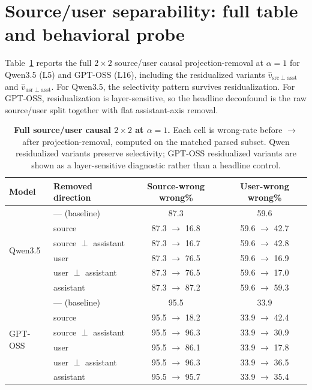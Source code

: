 \documentclass{article}
\begin{document}
\section{Source/user separability: full table and behavioral probe}
\label{app:source-user}

Table~\ref{tab:source-user-app} reports the full $2{\times}2$ source/user causal projection-removal at $\alpha=1$ for Qwen3.5 (L5) and GPT-OSS (L16), including the residualized variants $\hat{v}_{\mathrm{src}\perp\mathrm{asst}}$ and $\hat{v}_{\mathrm{usr}\perp\mathrm{asst}}$. For Qwen3.5, the selectivity pattern survives residualization. For GPT-OSS, residualization is layer-sensitive, so the headline deconfound is the raw source/user split together with flat assistant-axis removal.

\begin{table}[t]
\centering
\caption{\textbf{Full source/user causal $2{\times}2$ at $\alpha=1$.} Each cell is wrong-rate before $\rightarrow$ after projection-removal, computed on the matched parsed subset. Qwen residualized variants preserve selectivity; GPT-OSS residualized variants are shown as a layer-sensitive diagnostic rather than a headline control.}
\label{tab:source-user-app}
\small
\begin{tabular}{llcc}
\toprule
Model & Removed direction & Source-wrong wrong\% & User-wrong wrong\% \\
\midrule
\multirow{6}{*}{Qwen3.5}
 & --- (baseline)               & 87.3 & 59.6 \\
 & source                       & 87.3 $\rightarrow$ 16.8 & 59.6 $\rightarrow$ 42.7 \\
 & source $\perp$ assistant     & 87.3 $\rightarrow$ 16.7 & 59.6 $\rightarrow$ 42.8 \\
 & user                         & 87.3 $\rightarrow$ 76.5 & 59.6 $\rightarrow$ 16.9 \\
 & user $\perp$ assistant       & 87.3 $\rightarrow$ 76.5 & 59.6 $\rightarrow$ 17.0 \\
 & assistant                    & 87.3 $\rightarrow$ 87.2 & 59.6 $\rightarrow$ 59.3 \\
\midrule
\multirow{6}{*}{GPT-OSS}
 & --- (baseline)               & 95.5 & 33.9 \\
 & source                       & 95.5 $\rightarrow$ 18.2 & 33.9 $\rightarrow$ 42.4 \\
 & source $\perp$ assistant     & 95.5 $\rightarrow$ 96.3 & 33.9 $\rightarrow$ 30.9 \\
 & user                         & 95.5 $\rightarrow$ 86.1 & 33.9 $\rightarrow$ 17.8 \\
 & user $\perp$ assistant       & 95.5 $\rightarrow$ 96.3 & 33.9 $\rightarrow$ 36.5 \\
 & assistant                    & 95.5 $\rightarrow$ 95.7 & 33.9 $\rightarrow$ 35.4 \\
\bottomrule
\end{tabular}
\end{table}
\end{document}
